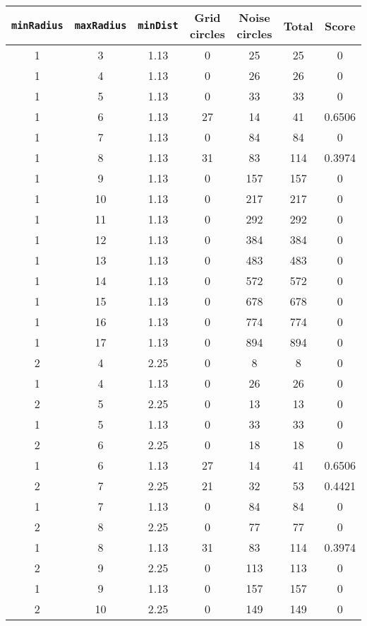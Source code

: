 \documentclass[letterpaper, 12pt]{article}
\begin{document}
\begin{longtable}{|c|c|c|c|c|c|c|}
\hline
\textbf{\texttt{minRadius}} & \textbf{\texttt{maxRadius}} & \textbf{\texttt{minDist}} & \textbf{Grid circles} & \textbf{Noise circles} & \textbf{Total} & \textbf{Score} \\
\hline
1 & 3 & 1.13 & 0 & 25 & 25 & 0 \\
\hline
1 & 4 & 1.13 & 0 & 26 & 26 & 0 \\
\hline
1 & 5 & 1.13 & 0 & 33 & 33 & 0 \\
\hline
1 & 6 & 1.13 & 27 & 14 & 41 & 0.6506 \\
\hline
1 & 7 & 1.13 & 0 & 84 & 84 & 0 \\
\hline
1 & 8 & 1.13 & 31 & 83 & 114 & 0.3974 \\
\hline
1 & 9 & 1.13 & 0 & 157 & 157 & 0 \\
\hline
1 & 10 & 1.13 & 0 & 217 & 217 & 0 \\
\hline
1 & 11 & 1.13 & 0 & 292 & 292 & 0 \\
\hline
1 & 12 & 1.13 & 0 & 384 & 384 & 0 \\
\hline
1 & 13 & 1.13 & 0 & 483 & 483 & 0 \\
\hline
1 & 14 & 1.13 & 0 & 572 & 572 & 0 \\
\hline
1 & 15 & 1.13 & 0 & 678 & 678 & 0 \\
\hline
1 & 16 & 1.13 & 0 & 774 & 774 & 0 \\
\hline
1 & 17 & 1.13 & 0 & 894 & 894 & 0 \\
\hline
2 & 4 & 2.25 & 0 & 8 & 8 & 0 \\
\hline
1 & 4 & 1.13 & 0 & 26 & 26 & 0 \\
\hline
2 & 5 & 2.25 & 0 & 13 & 13 & 0 \\
\hline
1 & 5 & 1.13 & 0 & 33 & 33 & 0 \\
\hline
2 & 6 & 2.25 & 0 & 18 & 18 & 0 \\
\hline
1 & 6 & 1.13 & 27 & 14 & 41 & 0.6506 \\
\hline
2 & 7 & 2.25 & 21 & 32 & 53 & 0.4421 \\
\hline
1 & 7 & 1.13 & 0 & 84 & 84 & 0 \\
\hline
2 & 8 & 2.25 & 0 & 77 & 77 & 0 \\
\hline
1 & 8 & 1.13 & 31 & 83 & 114 & 0.3974 \\
\hline
2 & 9 & 2.25 & 0 & 113 & 113 & 0 \\
\hline
1 & 9 & 1.13 & 0 & 157 & 157 & 0 \\
\hline
2 & 10 & 2.25 & 0 & 149 & 149 & 0 \\

\end{longtable}
\end{document}

